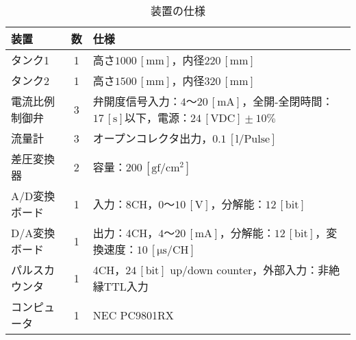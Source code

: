 \begin{table}[h]
  \begin{center}
    \caption{装置の仕様}
    \begin{tabular}{l|c|p{100mm}} \hline
      装置           & 数 & 仕様 \\ \hline
      タンク1        & 1  & 高さ$1000\,\mathrm{[mm]}$，内径$220\,\mathrm{[mm]}$ \\ \hline
      タンク2        & 1  & 高さ$1500\,\mathrm{[mm]}$，内径$320\,\mathrm{[mm]}$ \\ \hline
      電流比例制御弁 & 3  & 弁開度信号入力：$4〜20\,\mathrm{[mA]}$，全開-全閉時間：$17\,\mathrm{[s]}$以下，\newline 電源：$24\,\mathrm{[VDC]} \pm 10 \%$ \\ \hline
      流量計         & 3  & オープンコレクタ出力，$0.1\,\mathrm{[l/Pulse]}$ \\ \hline
      差圧変換器     & 2  & 容量：$200\,\mathrm{[gf/cm^2]}$ \\ \hline
      A/D変換ボード  & 1  & 入力：8CH，$0〜10\,\mathrm{[V]}$，分解能：$12\,\mathrm{[bit]}$ \\ \hline
      D/A変換ボード  & 1  & 出力：4CH，$4〜20\,\mathrm{[mA]}$，分解能：$12\,\mathrm{[bit]}$，変換速度：$10\,\mathrm{[\mu s/CH]}$ \\ \hline
      パルスカウンタ & 1  & 4CH，$24\,\mathrm{[bit]}$ up/down counter，外部入力：非絶縁TTL入力 \\ \hline
      コンピュータ   & 1  & NEC PC9801RX \\ \hline
    \end{tabular}
    \label{tab:spec}
  \end{center}
\end{table}
